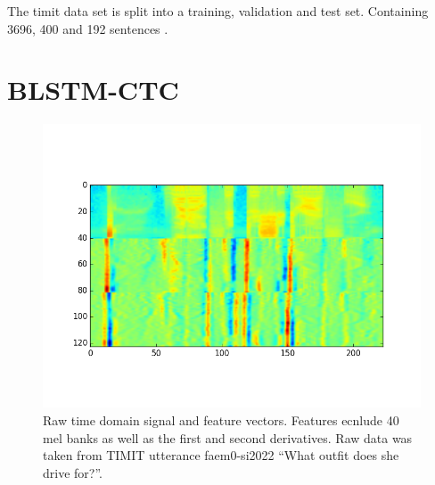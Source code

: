 The timit data set is split into a training, validation and test set. Containing 3696, 400 and 192 sentences \cite[page  80]{Graves2012}.


\section{BLSTM-CTC}
\begin{figure}
\centering

\includegraphics[width=0.49\linewidth]{png/feats_faem0_si2022.png}
\caption{Raw time domain signal and feature vectors. Features ecnlude 40 mel banks as well as the first and second derivatives. Raw data was taken from TIMIT utterance faem0-si2022 \enquote{What outfit does she drive for?}.}
\label{fig:timitFeats}
\end{figure}

